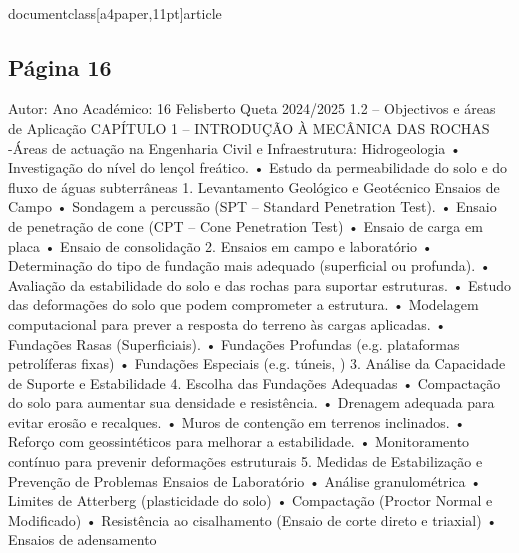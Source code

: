 \\documentclass[a4paper,11pt]{article}
\begin{document}
\subsection*{Página 16}
Autor:
Ano Académico:
16
Felisberto Queta
2024/2025
1.2 – Objectivos e áreas de Aplicação
CAPÍTULO 1 – INTRODUÇÃO À MECÂNICA DAS ROCHAS
-Áreas de actuação na Engenharia Civil e Infraestrutura:
Hidrogeologia
•
Investigação do nível do lençol freático.
•
Estudo da permeabilidade do solo e do fluxo de águas 
subterrâneas
1. Levantamento Geológico e Geotécnico
Ensaios de Campo
•
Sondagem a percussão (SPT – Standard Penetration Test).
•
Ensaio de penetração de cone (CPT – Cone Penetration
Test)
•
Ensaio de carga em placa
•
Ensaio de consolidação
2. Ensaios em campo e laboratório
•
Determinação do tipo de fundação mais adequado (superficial ou 
profunda).
•
Avaliação da estabilidade do solo e das rochas para suportar 
estruturas.
•
Estudo das deformações do solo que podem comprometer a 
estrutura.
•
Modelagem computacional para prever a resposta do terreno às 
cargas aplicadas.
•
Fundações Rasas (Superficiais).
•
Fundações Profundas (e.g. plataformas petrolíferas fixas)
•
Fundações Especiais (e.g. túneis, )
3. Análise da Capacidade de Suporte e Estabilidade
4. Escolha das Fundações Adequadas
•
Compactação do solo para aumentar sua densidade e 
resistência.
•
Drenagem adequada para evitar erosão e recalques.
•
Muros de contenção em terrenos inclinados.
•
Reforço com geossintéticos para melhorar a estabilidade.
•
Monitoramento contínuo para prevenir deformações estruturais
5. Medidas de Estabilização e Prevenção de Problemas
Ensaios de Laboratório
•
Análise granulométrica
•
Limites de Atterberg (plasticidade do solo)
•
Compactação (Proctor Normal e Modificado)
•
Resistência ao cisalhamento (Ensaio de corte direto e 
triaxial)
•
Ensaios de adensamento
\end{document}
